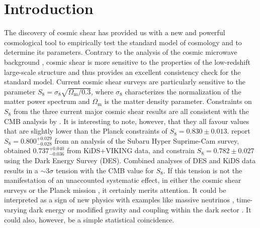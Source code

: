 \documentclass{aa}
\renewcommand{\rm}{\mathrm}
\begin{document}
   \maketitle

%
\section{Introduction}
The discovery of cosmic shear has provided us with a new and powerful cosmological tool to empirically test the standard model of cosmology and to determine its parameters. Contrary to the analysis of the cosmic microwave background \citep[CMB, e.g.~by][]{2018arXiv180706209P}, cosmic shear is more sensitive to the properties of the low-redshift large-scale structure and thus provides an excellent consistency check for the standard model. Current cosmic shear surveys are particularly sensitive to the parameter $S_8=\sigma_8 \sqrt{\Omega_{\rm m}/0.3}$, where $\sigma_8$ characterizes the normalization of the matter power spectrum and $\Omega_{\rm m}$ is the matter density parameter. Constraints on $S_8$ from the three current major cosmic shear results are all consistent with the CMB analysis by \citet{2018arXiv180706209P}. It is interesting to note, however, that they all favour values that are slightly lower than the Planck constraints of $S_8 = 0.830 \pm 0.013$. \citet{2018arXiv180909148H} report $S_8 = 0.800^{+0.029}_{-0.028}$ from an analysis of the Subaru Hyper Suprime-Cam survey, \citet[][hereafter H18]{2018arXiv181206076H} obtained $0.737_{-0.036}^{+0.040}$ from KiDS+VIKING data, and \citet{2018PhRvD..98d3528T} constrain $S_8=0.782\pm 0.027$ using the Dark Energy Survey (DES).  Combined analyses of DES and KiDS data \citep{Joudaki:2019, asgari/etal:2019} results in a $\sim 3 \sigma$ tension with the CMB value for $S_8$. If this tension is not the manifestation of an unaccounted systematic effect, in either the cosmic shear surveys \citep{Mandelbaum:2019} or the Planck mission \citep{2016ApJ...818..132A}, it certainly merits attention. It could be interpreted as a sign of new physics with examples like massive neutrinos \citep{2014PhRvL.112e1303B}, time-varying dark energy or modified gravity \citep{2016A&A...594A..14P} and coupling within the dark sector \citep{Kumar:2019}.  It could also, however, be a simple statistical coincidence.
\end{document}
